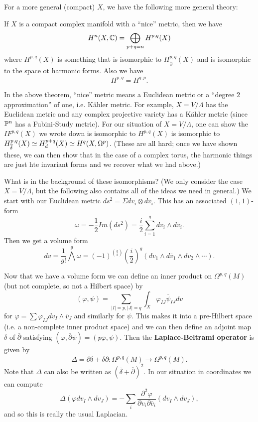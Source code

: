  
For a more general (compact) $X$, we have the following more general theory: 
\begin{theorem}
	If $X$ is a compact complex manifold with a ``nice'' metric, then we have 
	$$H^n(X , {\mathbb C})=\bigoplus_{p+q=n}H^{p,q}(X)$$ 
where $H^{p,q}(X)$ is something that is isomorphic to $H^{p,q}_{\overline{\partial}}(X)$ and is isomorphic to the space ot harmonic forms. Also we have	
$$H^{p,q}=\overline{H^{q,p}}.$$
\end{theorem}


In the above theorem, ``nice'' metric means a Euclidean metric or a ``degree $2$ approximation'' of one, i.e. K\"{a}hler metric. For example, $X=V/\Lambda$ has the Euclidean metric and any complex projective variety has a K\"{a}hler metric (since ${\mathbb P}^n$ has a Fubini-Study metric). For our situation of $X=V / \Lambda$, one can show the $IF^{p,q}(X)$ we wrote down is isomorphic to $H^{p,q}(X)$ is isomorphic to  
$H^{p,q}_{\overline{\delta}}(X)\simeq H^{p+q}_d(X)\simeq H^q(X,\Omega^p)$. (These are all hard; once we have shown these, we can then show that in the case of a complex torus, the harmonic things are just hte invariant forms and we recover what we had above.)

What is in the background of these isomorphisms? (We only consider the case $X=V/\Lambda$, but the following also contains all of the ideas we need in general.) We start with our Euclidean metric $ds^2=\Sigma dv_i\otimes d\overline{v}_i$. This has an associated $(1,1)$-form 
$$\omega=-\frac{1}{2}Im(ds^2)=\frac{i}{2}\sum_{i=1}^g dv_i\wedge d\overline{v}_i.$$
Then we get a volume form 
$$dv=\frac{1}{g!}\bigwedge^g \omega = (-1)^{\binom{g}{2}}\left(\frac{i}{2}\right)^g(dv_1\wedge d\overline{v}_1\wedge dv_2\wedge \cdots).$$

Now that we have a volume form we can define an inner product on $\Omega^{p,q}(M)$ (but not complete, so not a Hilbert space) by 
$$(\varphi,\psi)=\sum_{|I|=p,|J|=q} \int_X \varphi_{IJ}\overline{\psi}_{IJ}dv$$
for $\varphi=\sum \varphi_{IJ}dv_I\wedge \overline{v}_J$ and similarly for $\psi$. 
This makes it into a pre-Hilbert space (i.e. a non-complete inner product space) and we can then define an adjoint map $\overline{\delta}$ of $\overline{\partial}$ satisfying $(\varphi,\overline{\partial}\psi)=(p\overline{\varphi},\psi)$. Then the \textbf{Laplace-Beltrami operator} is given by
$$\Delta=\overline{\partial\delta}+\overline{\delta\partial}:\Omega^{p,q}(M)\to \Omega^{p,q}(M).$$
Note that $\Delta$ can also be written as $(\overline{\delta}+\overline{\partial})^2$.
In our situation in coordinates we can compute 
$$\Delta(\varphi dv_I\wedge dv_J)=-\sum_i \frac{\partial^2 \varphi}{\partial v_i\partial \overline{v}_i}(dv_I\wedge dv_J),$$
and so this is really the usual Laplacian.

